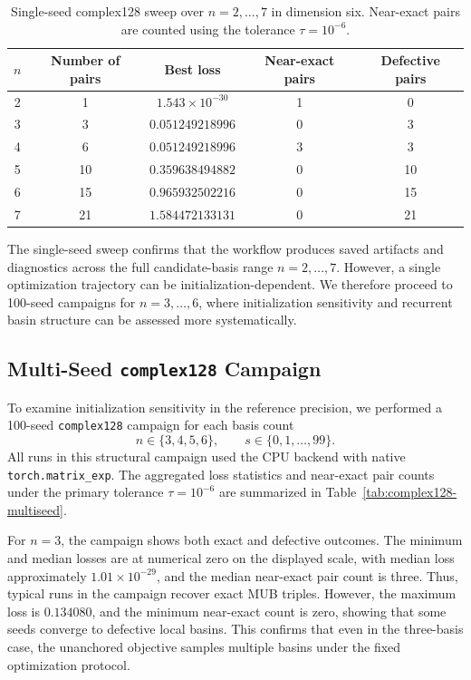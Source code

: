 \documentclass[a4paper,twocolumn,11pt,amsfonts,amssymb]{quantumarticle}
\begin{document}
\begin{table}[t]
  \caption{Single-seed complex128 sweep over $n=2,\ldots,7$ in dimension six. Near-exact pairs are counted using the tolerance $\tau = 10^{-6}$.}
  \label{tab:single-seedSweep}
  \begin{tabular}{ccccc}
    \toprule
    $n$ & Number of pairs & Best loss & Near-exact pairs & Defective pairs \\
    \midrule
    2 & 1  & $1.543\times 10^{-30}$ & 1 & 0 \\
    3 & 3  & $0.051249218996$ & 0 & 3 \\
    4 & 6  & $0.051249218996$ & 3 & 3 \\
    5 & 10 & $0.359638494882$ & 0 & 10 \\
    6 & 15 & $0.965932502216$ & 0 & 15 \\
    7 & 21 & $1.584472133131$ & 0 & 21 \\
    \bottomrule
  \end{tabular}
\end{table}
The single-seed sweep confirms that the workflow produces saved artifacts and diagnostics across the full candidate-basis range \(n=2,\ldots,7\). However, a single optimization trajectory can be initialization-dependent. We therefore proceed to 100-seed campaigns for \(n=3,\ldots,6\), where initialization sensitivity and recurrent basin structure can be assessed more systematically.

\subsection{\texorpdfstring{Multi-Seed \texttt{complex128} Campaign}{Multi-Seed complex128 Campaign}}
\label{subsec:complex128-campaign}

To examine initialization sensitivity in the reference precision, we performed a 100-seed \texttt{complex128} campaign for each basis count
\[
n \in \{3,4,5,6\},
\qquad
s \in \{0,1,\ldots,99\}.
\]
All runs in this structural campaign used the CPU backend with native \texttt{torch.matrix\_exp}. The aggregated loss statistics and near-exact pair counts under the primary tolerance \(\tau=10^{-6}\) are summarized in Table~\ref{tab:complex128-multiseed}.

For \(n=3\), the campaign shows both exact and defective outcomes. The minimum and median losses are at numerical zero on the displayed scale, with median loss approximately \(1.01\times 10^{-29}\), and the median near-exact pair count is three. Thus, typical runs in the campaign recover exact MUB triples. However, the maximum loss is \(0.134080\), and the minimum near-exact count is zero, showing that some seeds converge to defective local basins. This confirms that even in the three-basis case, the unanchored objective samples multiple basins under the fixed optimization protocol.
\end{document}
